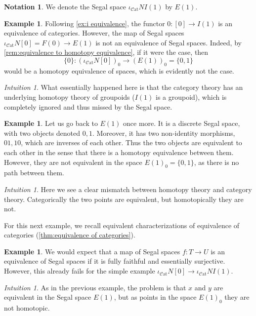\documentclass[11pt, a4paper]{amsart}
\newcommand{\Cat}{\mathscr{C}\mathrm{at}}
\newcommand{\inccat}{\iota_{\Cat}}
\theoremstyle{definition}
\newtheorem{example}[equation]{Example}
\newtheorem{notation}[equation]{Notation}
\theoremstyle{remark}
\newtheorem{intuition}[equation]{Intuition}
\numberwithin{equation}{section}
\begin{document}
\begin{notation}
  We denote the Segal space $\inccat N I(1)$ by $E(1)$.
\end{notation}

 \begin{example}
  Following \cref{ex:i equivalence}, the functor $0\colon[0] \to I(1)$ is an equivalence of categories. However, the map of Segal spaces $\inccat N [0]  = F(0)\to E(1)$ is not an equivalence of Segal spaces. Indeed, by \cref{rem:equivalence to homotopy equivalence}, if it were the case, then
  \[\{0\}\colon (\inccat N[0])_0 \to (E(1))_0 = \{0,1\}\]
  would be a homotopy equivalence of spaces, which is evidently not the case.
 \end{example}

 \begin{intuition}
  What essentially happened here is that the category theory has an underlying homotopy theory of groupoids ($I(1)$ is a groupoid), which is completely ignored and thus missed by the Segal space.
 \end{intuition}

 \begin{example}
  Let us go back to $E(1)$ once more. It is a discrete Segal space, with two objects denoted $0,1$. Moreover, it has two non-identity morphisms, $01, 10$, which are inverses of each other. Thus the two objects are equivalent to each other in the sense that there is a homotopy equivalence between them. However, they are not equivalent in the space $E(1)_0 = \{0,1\}$, as there is no path between them.
 \end{example}

 \begin{intuition}
  Here we see a clear mismatch between homotopy theory and category theory. Categorically the two points are equivalent, but homotopically they are not. 
 \end{intuition}

 For this next example, we recall equivalent characterizations of equivalence of categories (\cref{thm:equivalence of categories}).
 \begin{example}
  We would expect that a map of Segal spaces $f\colon T \to U$ is an equivalence of Segal spaces if it is fully faithful and essentially surjective. However, this already fails for the simple example $\inccat N [0] \to \inccat N I(1)$.
 \end{example}
 
 \begin{intuition}
  As in the previous example, the problem is that $x$ and $y$ are equivalent in the Segal space $E(1)$, but as points in the space $E(1)_0$ they are not homotopic.
 \end{intuition}
  
\end{document}
